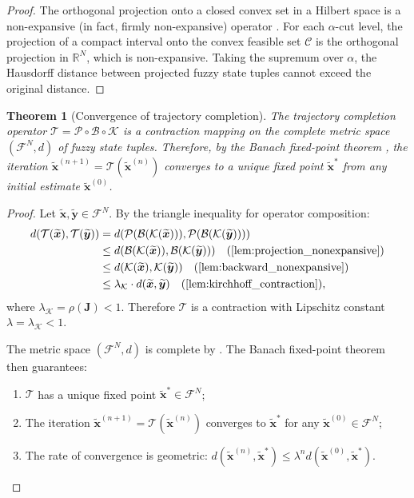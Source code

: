 \documentclass[twocolumn,10pt,a4paper]{article}
\newtheorem{theorem}{Theorem}[section]
\theoremstyle{definition}
\theoremstyle{remark}
\newcommand{\R}{\mathbb{R}}
\newcommand{\Fcal}{\mathcal{F}}
\newcommand{\Tcal}{\mathcal{T}}
\newcommand{\Pcal}{\mathcal{P}}
\newcommand{\vect}[1]{\boldsymbol{#1}}
\newcommand{\mat}[1]{\mathbf{#1}}
\newcommand{\fuzzy}[1]{\widetilde{#1}}
\begin{document}
\begin{proof}
The orthogonal projection onto a closed convex set in a Hilbert space is a non-expansive (in fact, firmly non-expansive) operator \citep{Rudin1991}. For each $\alpha$-cut level, the projection of a compact interval onto the convex feasible set $\mathcal{C}$ is the orthogonal projection in $\R^N$, which is non-expansive. Taking the supremum over $\alpha$, the Hausdorff distance between projected fuzzy state tuples cannot exceed the original distance.
\end{proof}

\begin{theorem}[Convergence of trajectory completion]\label{thm:convergence}
The trajectory completion operator $\Tcal = \Pcal \circ \mathcal{B} \circ \mathcal{K}$ is a contraction mapping on the complete metric space $(\Fcal^N, d)$ of fuzzy state tuples. Therefore, by the Banach fixed-point theorem \citep{Banach1922}, the iteration $\fuzzy{\vect{x}}^{(n+1)} = \Tcal(\fuzzy{\vect{x}}^{(n)})$ converges to a unique fixed point $\fuzzy{\vect{x}}^*$ from any initial estimate $\fuzzy{\vect{x}}^{(0)}$.
\end{theorem}

\begin{proof}
Let $\fuzzy{\vect{x}}, \fuzzy{\vect{y}} \in \Fcal^N$. By the triangle inequality for operator composition:
\begin{align}
d(\Tcal(\fuzzy{\vect{x}}), \Tcal(\fuzzy{\vect{y}})) &= d(\Pcal(\mathcal{B}(\mathcal{K}(\fuzzy{\vect{x}}))), \Pcal(\mathcal{B}(\mathcal{K}(\fuzzy{\vect{y}})))) \nonumber \\
&\leq d(\mathcal{B}(\mathcal{K}(\fuzzy{\vect{x}})), \mathcal{B}(\mathcal{K}(\fuzzy{\vect{y}}))) \quad \text{(\Cref{lem:projection_nonexpansive})} \nonumber \\
&\leq d(\mathcal{K}(\fuzzy{\vect{x}}), \mathcal{K}(\fuzzy{\vect{y}})) \quad \text{(\Cref{lem:backward_nonexpansive})} \nonumber \\
&\leq \lambda_{\mathcal{K}} \cdot d(\fuzzy{\vect{x}}, \fuzzy{\vect{y}}) \quad \text{(\Cref{lem:kirchhoff_contraction})},
\end{align}
where $\lambda_{\mathcal{K}} = \rho(\mat{J}) < 1$. Therefore $\Tcal$ is a contraction with Lipschitz constant $\lambda = \lambda_{\mathcal{K}} < 1$.

The metric space $(\Fcal^N, d)$ is complete by . The Banach fixed-point theorem \citep{Banach1922, Granas2003} then guarantees:
\begin{enumerate}[label=(\roman*)]
\item $\Tcal$ has a unique fixed point $\fuzzy{\vect{x}}^* \in \Fcal^N$;
\item The iteration $\fuzzy{\vect{x}}^{(n+1)} = \Tcal(\fuzzy{\vect{x}}^{(n)})$ converges to $\fuzzy{\vect{x}}^*$ for any $\fuzzy{\vect{x}}^{(0)} \in \Fcal^N$;
\item The rate of convergence is geometric: $d(\fuzzy{\vect{x}}^{(n)}, \fuzzy{\vect{x}}^*) \leq \lambda^n d(\fuzzy{\vect{x}}^{(0)}, \fuzzy{\vect{x}}^*)$.
\end{enumerate}
\end{proof}
\end{document}
